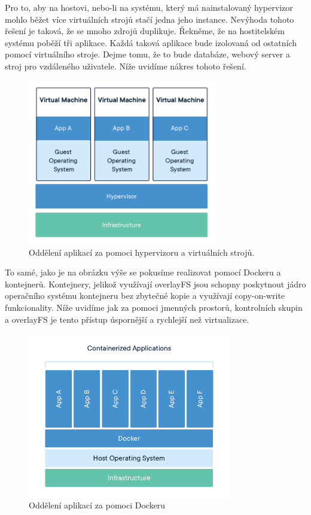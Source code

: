 Pro to, aby na hostovi, nebo-li na systému, který má nainstalovaný hypervizor mohlo běžet více virtuálních strojů stačí jedna jeho instance. Nevýhoda tohoto řešení je taková, že se mnoho zdrojů duplikuje. Řekněme, že na hostitelském systému poběží tři aplikace. Každá taková aplikace bude izolovaná od ostatních pomocí virtuálního stroje. Dejme tomu, že to bude databáze, webový server a stroj pro vzdáleného uživatele. Níže uvidíme nákres tohoto řešení. 

\begin{figure}[!ht]
	\centering
	\includegraphics[width=0.73\textwidth, angle=0]{docker-VM.png}
	\caption[Docker VM]{Oddělení aplikací za pomoci hypervizoru a virtuálních strojů.}
	\label{fig:docker-vm}
\end{figure}

To samé, jako je na obrázku výše se pokusíme realizovat pomocí Dockeru a kontejnerů. Kontejnery, jelikož využívají overlayFS jsou schopny poskytnout jádro operačního systému kontejneru bez zbytečné kopie a využívají copy-on-write funkcionality. Níže uvidíme jak za pomoci jmenných prostorů, kontrolních skupin a overlayFS je tento přístup úspornější a rychlejší než virtualizace. 


\begin{figure}[!ht]
	\centering
	\includegraphics[width=0.8\textwidth, angle=0]{docker-docker.png}
	\caption[Docker kontejnery]{Oddělení aplikací za pomoci Dockeru}
	\label{fig:docker-docker}
\end{figure}

